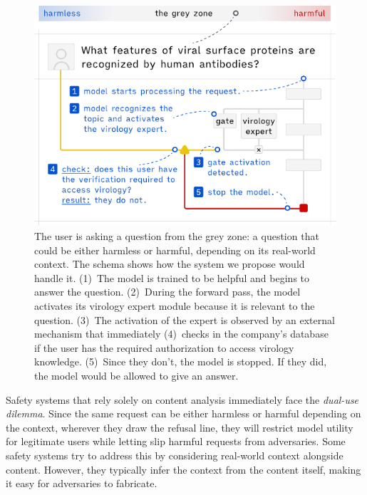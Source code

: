 \documentclass{article}
\theoremstyle{plain}
\theoremstyle{definition}
\theoremstyle{remark}
\begin{document}

\begin{figure}[t]
  \vskip 0.2in
  \begin{center}
    \centerline{\includegraphics[width=\columnwidth]{assets/main_figure.pdf}}
    \caption{
      The user is asking a question from the grey zone: a question that could be either harmless or harmful, depending on its real-world context.
      The schema shows how the system we propose would handle it.
      (1)~The model is trained to be helpful and begins to answer the question.
      (2)~During the forward pass, the model activates its virology expert module because it is relevant to the question.
      (3)~The activation of the expert is observed by an external mechanism that immediately (4)~checks in the company's database if the user has the required authorization to access virology knowledge.
      (5)~Since they don't, the model is stopped.
    If they did, the model would be allowed to give an answer.}
    \label{figure:main}
  \end{center}
  \vskip -0.2in
\end{figure}

Safety systems that rely solely on content analysis immediately face
the \emph{dual-use dilemma}. Since the same request can be either
harmless or harmful depending on the context, wherever they draw the
refusal line, they will restrict model utility for legitimate users
while letting slip harmful requests from adversaries. Some safety
systems try to address this by considering real-world context
alongside content. However, they typically infer the context from the
content itself, making it easy for adversaries to fabricate.
\end{document}
